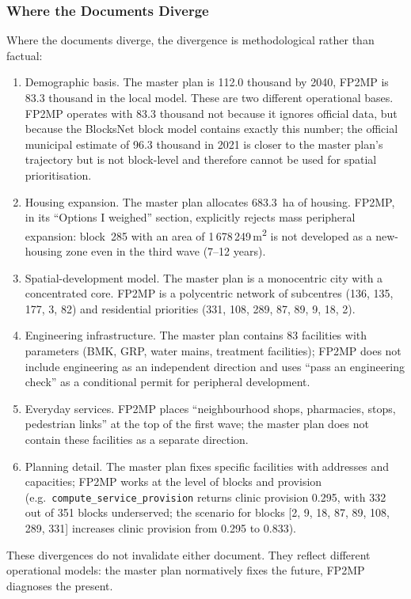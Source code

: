 \subsubsection{Where the Documents Diverge}
\label{sec:comparison-divergences}
 
Where the documents diverge, the divergence is methodological rather than factual:
 
\begin{enumerate}
  \item Demographic basis. The master plan is 112.0 thousand by 2040, FP2MP is 83.3 thousand in the local model. These are two different operational bases. FP2MP operates with 83.3 thousand not because it ignores official data, but because the BlocksNet block model contains exactly this number; the official municipal estimate of 96.3 thousand in 2021 is closer to the master plan's trajectory but is not block-level and therefore cannot be used for spatial prioritisation.
 
  \item Housing expansion. The master plan allocates 683.3~ha of housing. FP2MP, in its ``Options I weighed'' section, explicitly rejects mass peripheral expansion: block~285 with an area of 1\,678\,249\,m\textsuperscript{2} is not developed as a new-housing zone even in the third wave (7--12 years).
 
  \item Spatial-development model. The master plan is a monocentric city with a concentrated core. FP2MP is a polycentric network of subcentres (136, 135, 177, 3, 82) and residential priorities (331, 108, 289, 87, 89, 9, 18, 2).
 
  \item Engineering infrastructure. The master plan contains 83 facilities with parameters (BMK, GRP, water mains, treatment facilities); FP2MP does not include engineering as an independent direction and uses ``pass an engineering check'' as a conditional permit for peripheral development.
 
  \item Everyday services. FP2MP places ``neighbourhood shops, pharmacies, stops, pedestrian links'' at the top of the first wave; the master plan does not contain these facilities as a separate direction.
 
  \item Planning detail. The master plan fixes specific facilities with addresses and capacities; FP2MP works at the level of blocks and provision (e.g.\ \texttt{compute\_service\_provision} returns clinic provision 0.295, with 332 out of 351 blocks underserved; the scenario for blocks [2, 9, 18, 87, 89, 108, 289, 331] increases clinic provision from 0.295 to 0.833).
\end{enumerate}
 
These divergences do not invalidate either document. They reflect different operational models: the master plan normatively fixes the future, FP2MP diagnoses the present.
 